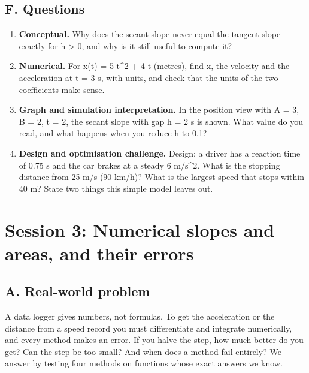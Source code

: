 \documentclass[11pt,a4paper]{article}
\begin{document}
\subsection*{F. Questions}
\begin{enumerate}[nosep]
\item \textbf{Conceptual.} Why does the secant slope never equal the tangent slope exactly for h \textgreater{} 0, and why is it still useful to compute it?
\item \textbf{Numerical.} For x(t) = 5 t\textasciicircum{}2 + 4 t (metres), find x, the velocity and the acceleration at t = 3 s, with units, and check that the units of the two coefficients make sense.
\item \textbf{Graph and simulation interpretation.} In the position view with A = 3, B = 2, t = 2, the secant slope with gap h = 2 s is shown. What value do you read, and what happens when you reduce h to 0.1?
\item \textbf{Design and optimisation challenge.} Design: a driver has a reaction time of 0.75 s and the car brakes at a steady 6 m/s\textasciicircum{}2. What is the stopping distance from 25 m/s (90 km/h)? What is the largest speed that stops within 40 m? State two things this simple model leaves out.
\end{enumerate}

\section{Session 3: Numerical slopes and areas, and their errors}

\subsection*{A. Real-world problem}
A data logger gives numbers, not formulas. To get the acceleration or the distance from a speed record you must differentiate and integrate numerically, and every method makes an error. If you halve the step, how much better do you get? Can the step be too small? And when does a method fail entirely? We answer by testing four methods on functions whose exact answers we know.
\end{document}
